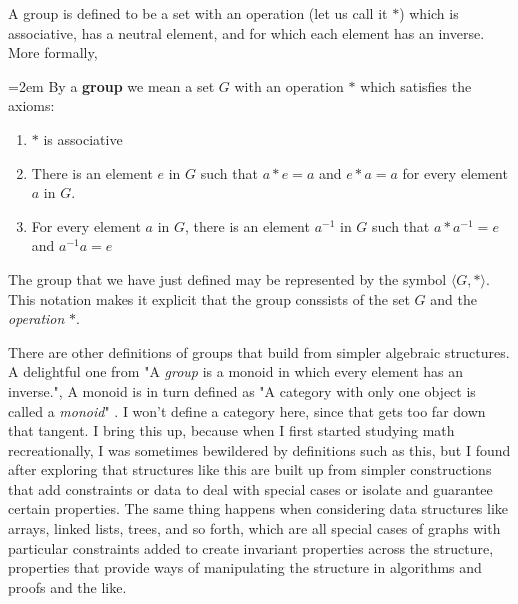 \documentclass[10pt,letterpaper,final]{report}
\begin{document}
\begin{tcolorbox}[colback=blue!10!white, colframe=blue!10!black, title={The Definition of Groups \citetitle[Ch. 3, p. 25]{Pinter2010BookOfAbstractAlgebra}}]
  A group is defined to be a set with an operation (let us call it $*$) which is associative, has a neutral element, and for which each element has an inverse. More formally,
  \par
  \begingroup
  \leftskip=2em \parindent=0pt
  By a \textbf{group} we mean a set $G$ with an operation $*$ which satisfies the axioms:
  \begin{enumerate}[label=(G\arabic*)]
    \item $*$ is associative
    \item There is an element $e$ in $G$ such that $a * e = a$ and $e * a = a$ for every element $a$ in $G$.
    \item For every element $a$ in $G$, there is an element $a^{-1}$ in $G$ such that $a*a^{-1} = e$ and $a^{-1}a = e$
  \end{enumerate}
  \par
  \endgroup

  The group that we have just defined may be represented by the symbol $\langle G, * \rangle$. This notation makes it explicit that the group conssists of the set $G$ and the \emph{operation} $*$.
\end{tcolorbox}

There are other definitions of groups that build from simpler algebraic structures. A delightful one from  "A \emph{group} is a monoid in which every element has an inverse.", A monoid is in turn defined as "A category with only one object is called a \emph{monoid}" \cite[p.126]{Cheng2022JoyOfAbstraction}. I won't define a category here, since that gets too far down that tangent. I bring this up, because when I first started studying math recreationally, I was sometimes bewildered by definitions such as this, but I found after exploring that structures like this are built up from simpler constructions that add constraints or data to deal with special cases or isolate and guarantee certain properties. The same thing happens when considering data structures like arrays, linked lists, trees, and so forth, which are all special cases of graphs with particular constraints added to create invariant properties across the structure, properties that provide ways of manipulating the structure in algorithms and proofs and the like.
\end{document}
